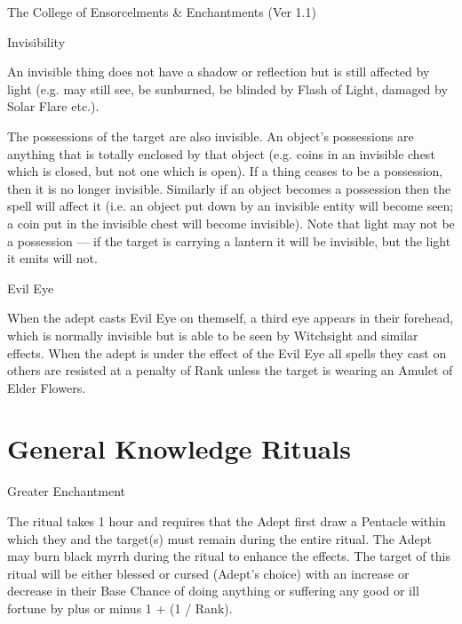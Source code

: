 \begin{Chapter}{The College of Ensorcelments \& Enchantments (Ver 1.1)}
\begin{spell}[G-8]{Invisibility}
\begin{effects}
An invisible thing does not have a shadow or reflection but is still
affected by light (e.g.  may still see, be sunburned, be blinded by
Flash of Light, damaged by Solar Flare etc.).

The possessions of the target are also invisible. An object’s
possessions are anything that is totally enclosed by that object (e.g.
coins in an invisible chest which is closed, but not one which is
open).  If a thing ceases to be a possession, then it is no longer
invisible.  Similarly if an object becomes a possession then the spell
will affect it (i.e.  an object put down by an invisible entity will
become seen; a coin put in the invisible chest will become invisible).
Note that light may not be a possession — if the target is carrying a
lantern it will be invisible, but the light it emits will not.
\end{effects}
\end{spell}

\begin{spell}[G-9]{Evil Eye }

\begin{effects}
When the adept casts Evil Eye on themself, a third eye appears in
their forehead, which is normally invisible but is able to be seen by
Witchsight and similar effects.  When the adept is under the effect of
the Evil Eye all spells they cast on others are resisted at a penalty
of Rank unless the target is wearing an Amulet of Elder Flowers.
\end{effects}
\end{spell}

\section{General Knowledge Rituals}

\begin{ritual}[Q-1]{Greater Enchantment}

\begin{effects}
The ritual takes 1 hour and requires that the Adept first draw a
Pentacle within which they and the target(s) must remain during the
entire ritual. The Adept may burn black myrrh during the ritual to
enhance the effects.  The target of this ritual will be either blessed
or cursed (Adept’s choice) with an increase or decrease in their Base
Chance of doing anything or suffering any good or ill fortune by plus
or minus 1 + (1 / Rank).


\end{effects}
\end{ritual}
\end{Chapter}

